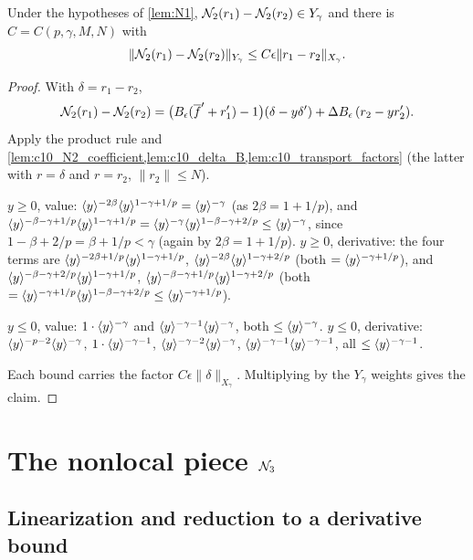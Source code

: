 \begin{lemma}
  \label{lem:N2}
  Under the hypotheses of \cref{lem:N1}, $\mathcal{N}_2(r_1)-\mathcal{N}_2(r_2)\in Y_\gamma$ and there is
  $C=C(p,\gamma,M,N)$ with
  \[
    \|\mathcal{N}_2(r_1)-\mathcal{N}_2(r_2)\|_{Y_\gamma}\le C\epsilon\|r_1-r_2\|_{X_\gamma}.
  \]
\end{lemma}
\begin{proof}
  With $\delta=r_1-r_2$,
  \[
    \mathcal{N}_2(r_1)-\mathcal{N}_2(r_2)=\bigl(B_\epsilon(\overline{f}'+r_1')-1\bigr)(\delta-y\delta')+\Delta B_\epsilon\,(r_2-yr_2').
  \]
  Apply the product rule and \cref{lem:c10_N2_coefficient,lem:c10_delta_B,lem:c10_transport_factors}
  (the latter with $r=\delta$ and $r=r_2$, $\|r_2\|\le N$).

  $y\ge0$, value: $\langle y \rangle^{-2\beta}\langle y \rangle^{1-\gamma+1/p}=\langle y \rangle^{-\gamma}$ (as $2\beta=1+1/p$), and
  $\langle y \rangle^{-\beta-\gamma+1/p}\langle y \rangle^{1-\gamma+1/p}=\langle y \rangle^{-\gamma}\langle y \rangle^{1-\beta-\gamma+2/p}\le\langle y \rangle^{-\gamma}$,
  since $1-\beta+2/p=\beta+1/p<\gamma$ (again by $2\beta=1+1/p$).
  $y\ge0$, derivative: the four terms are $\langle y \rangle^{-2\beta+1/p}\langle y \rangle^{1-\gamma+1/p}$,
  $\langle y \rangle^{-2\beta}\langle y \rangle^{1-\gamma+2/p}$ (both $=\langle y \rangle^{-\gamma+1/p}$), and
  $\langle y \rangle^{-\beta-\gamma+2/p}\langle y \rangle^{1-\gamma+1/p}$, $\langle y \rangle^{-\beta-\gamma+1/p}\langle y \rangle^{1-\gamma+2/p}$
  (both $=\langle y \rangle^{-\gamma+1/p}\langle y \rangle^{1-\beta-\gamma+2/p}\le\langle y \rangle^{-\gamma+1/p}$).

  $y\le0$, value: $1\cdot\langle y \rangle^{-\gamma}$ and $\langle y \rangle^{-\gamma-1}\langle y \rangle^{-\gamma}$, both $\le\langle y \rangle^{-\gamma}$.
  $y\le0$, derivative: $\langle y \rangle^{-p-2}\langle y \rangle^{-\gamma}$, $1\cdot\langle y \rangle^{-\gamma-1}$,
  $\langle y \rangle^{-\gamma-2}\langle y \rangle^{-\gamma}$, $\langle y \rangle^{-\gamma-1}\langle y \rangle^{-\gamma-1}$, all $\le\langle y \rangle^{-\gamma-1}$.

  Each bound carries the factor $C\epsilon\|\delta\|_{X_\gamma}$. Multiplying by the $Y_\gamma$ weights gives the claim.
\end{proof}

\section{The nonlocal piece $\mathcal{N}_3$}

\subsection{Linearization and reduction to a derivative bound}

